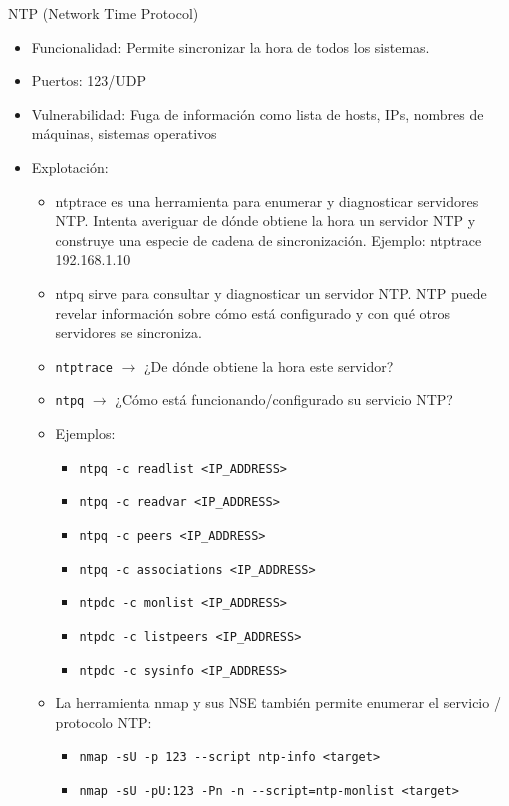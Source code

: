 \documentclass[aspectratio=169,11pt]{beamer}
\newcommand{\cmd}[1]{\texttt{#1}}
\begin{document}
\begin{frame}[allowframebreaks]{NTP (Network Time Protocol)}
\small
  \begin{itemize}
  \item Funcionalidad: Permite sincronizar la hora de todos los sistemas.
  \item Puertos: 123/UDP
  \item Vulnerabilidad: Fuga de información como lista de hosts, IPs, nombres de máquinas, sistemas operativos
  \item Explotación:
    \begin{itemize}
    \item ntptrace es una herramienta para enumerar y diagnosticar servidores NTP. Intenta averiguar de dónde obtiene la hora un servidor NTP y construye una especie de cadena de sincronización. Ejemplo: ntptrace 192.168.1.10
    \item ntpq sirve para consultar y diagnosticar un servidor NTP. NTP puede revelar información sobre cómo está configurado y con qué otros servidores se sincroniza. 
    \item \cmd{ntptrace} $\rightarrow$ ¿De dónde obtiene la hora este servidor?
    \item \cmd{ntpq} $\rightarrow$ ¿Cómo está funcionando/configurado su servicio NTP?
    \item Ejemplos: 
        \begin{itemize}

    \item \cmd{ntpq -c readlist <IP\_ADDRESS>}
      \item \cmd{ntpq -c readvar <IP\_ADDRESS>}
      \item \cmd{ntpq -c peers <IP\_ADDRESS>}
      \item \cmd{ntpq -c associations <IP\_ADDRESS>}
      \item \cmd{ntpdc -c monlist <IP\_ADDRESS>}
      \item \cmd{ntpdc -c listpeers <IP\_ADDRESS>}
      \item \cmd{ntpdc -c sysinfo <IP\_ADDRESS>}
          \end{itemize}
\item La herramienta nmap y sus NSE también permite enumerar el servicio / protocolo NTP:
        \begin{itemize}      
\item \cmd{nmap -sU -p 123 -{}-script ntp-info <target>}
    \item \cmd{nmap -sU -pU:123 -Pn -n -{}-script=ntp-monlist <target>}
\end{itemize}
  \end{itemize}
  \end{itemize}
\end{frame}
\end{document}
